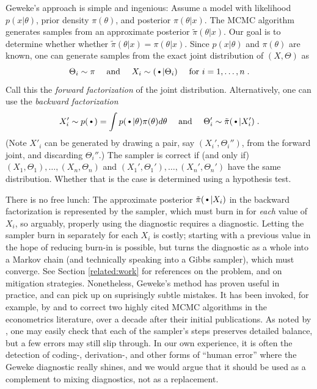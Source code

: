 \documentclass{article}
\newcommand{\argdot}{{\,\vcenter{\hbox{\tiny$\bullet$}}\,}}%
\begin{document}
Geweke's approach is simple and ingenious:
Assume a model with 
likelihood $p(x|\theta)$, prior density $\pi(\theta)$, and posterior
$\pi(\theta|x)$. The MCMC algorithm generates samples from an
approximate posterior $\tilde{\pi}(\theta|x)$. Our goal is to 
determine whether whether $\tilde{\pi}(\theta|x)=\pi(\theta|x)$. 
Since $p(x|\theta)$ and $\pi(\theta)$ are known, one can generate
samples from the exact joint distribution of $(X,\Theta)$ as
\begin{equation*}
  \Theta_i\sim \pi
  \quad\text{ and }\quad
  X_i\sim(\argdot|\Theta_i)\quad\text{ for }i=1,\ldots,n\;.
\end{equation*}
Call this the \emph{forward factorization} of the joint distribution.
Alternatively, one can use the \emph{backward factorization}
\begin{equation*}
  X'_i\sim p(\argdot)=\int p(\argdot|\theta)\pi(\theta)d\theta
  \quad\text{ and }\quad
  \Theta'_i\sim\tilde{\pi}(\argdot|X'_i)\;.
\end{equation*}
(Note $X'_i$ can be generated by drawing a pair, say $(X_i',\Theta_i'')$, from the forward joint,
and discarding $\Theta_i''$.) The sampler is correct if (and only if) ${(X_1,\Theta_1),\ldots,(X_n,\Theta_n)}$
and ${(X_1',\Theta_1'),\ldots,(X_n',\Theta_n')}$ have the same
distribution. Whether that is the case is determined using a
hypothesis test.

There is no free lunch: The approximate posterior
$\tilde{\pi}(\argdot|X_i)$ in the backward factorization
is represented by the sampler, which must burn in for \emph{each}
value of $X_i$, so arguably, properly using the diagnostic requires a
diagnostic. Letting the sampler burn in separately for each $X_i$ is
costly; starting with a previous value in the hope of reducing burn-in
is possible, but turns the diagnostic as a whole into a Markov chain
(and technically speaking into a Gibbs sampler), which must converge.
See Section \ref{related:work} for references on the problem, and on
mitigation strategies.
Nonetheless, Geweke's method has proven useful in practice, and can pick up
on suprisingly subtle mistakes.
It has been invoked, for example, by \citet{del_negro_time_2015} and
\citet{karlsson_corrigendum_2017} to correct two highly cited MCMC
algorithms in the econometrics literature, over a decade after their
initial publications.
As noted by \citet{grosse_testing_2014}, one may easily check that each of the sampler's steps preserves detailed balance, but a few errors may still slip through. 
In our own experience, it is often the detection of coding-,
derivation-, and other forms of ``human error'' where the Geweke diagnostic really
shines, and we would argue that it should be used as a complement to
mixing diagnostics, not as a replacement.
\end{document}
